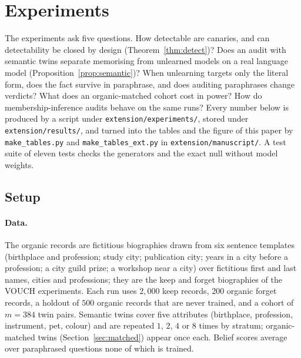 \section{Experiments}\label{sec:experiments}

The experiments ask five questions. How detectable are canaries, and can detectability be
closed by design (Theorem~\ref{thm:detect})? Does an audit with semantic twins separate
memorising from unlearned models on a real language model
(Proposition~\ref{prop:semantic})? When unlearning targets only the literal form, does
the fact survive in paraphrase, and does auditing paraphrases change verdicts? What does
an organic-matched cohort cost in power? How do membership-inference audits behave on the
same runs? Every number below is produced by a script under
\texttt{extension/experiments/}, stored under \texttt{extension/results/}, and turned into
the tables and the figure of this paper by \texttt{make\_tables.py} and
\texttt{make\_tables\_ext.py} in \texttt{extension/manuscript/}. A test suite of eleven
tests checks the generators and the exact null without model weights.

\subsection{Setup}\label{sec:exp-setup}

\paragraph{Data.} The organic records are fictitious biographies drawn from six sentence
templates (birthplace and profession; study city; publication city; years in a city
before a profession; a city guild prize; a workshop near a city) over fictitious first
and last names, cities and professions; they are the keep and forget biographies of the
VOUCH experiments. Each run uses $2{,}000$ keep records, $200$ organic forget records, a
holdout of $500$ organic records that are never trained, and a cohort of $m=384$ twin
pairs. Semantic twins cover five attributes (birthplace, profession, instrument, pet,
colour) and are repeated $1$, $2$, $4$ or $8$ times by stratum; organic-matched twins
(Section~\ref{sec:matched}) appear once each. Belief scores average over paraphrased
questions none of which is trained.


